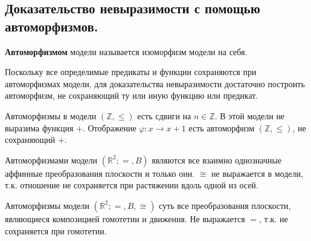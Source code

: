 \subsection{Доказательство невыразимости с помощью автоморфизмов.}

\begin{definition}
	\textbf{Автоморфизмом} модели называется изоморфизм модели на себя.
\end{definition}


Поскольку все определимые предикаты и функции сохраняются при автоморфизмах модели, для доказательства
невыразимости достаточно построить автоморфизм, не сохраняющий ту или иную функцию или предикат.

\begin{example}
Автоморфизмы в модели $(\mathbb{Z}, \leqslant)$ есть сдвиги на $n \in \mathbb{Z}$. В этой модели не выразима
	функция $+$. Отображение $\varphi: x \rightarrow x+1$ есть автоморфизм $(\mathbb{Z}, \leqslant)$, не
	сохраняющий $+$.
\end{example}

\begin{example}
Автоморфизмами модели $\left(\mathbb{R}^{2} ;=, B \right)$ являются все взаимно однозначные аффинные преобразования
	плоскости и только они. $\cong$ не выражается в модели, т.к. отношение не сохраняется при растяжении вдоль
	одной из осей.
\end{example}

\begin{example}
 Автоморфизмы модели $\left(\mathbb{R}^{2} ;=, B, \cong\right)$ суть все преобразования плоскости, являющиеся
	композицией гомотетии и движения. Не выражается $=$, т.к. не сохраняется при гомотетии.
\end{example}
